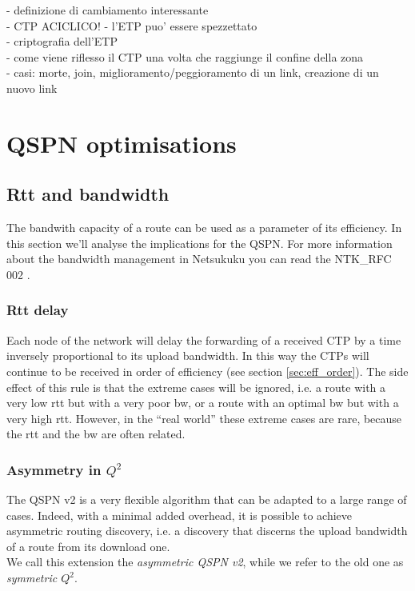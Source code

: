 \documentclass[a4paper]{article}
\begin{document}
- definizione di cambiamento interessante\\
- CTP ACICLICO!
- l'ETP puo' essere spezzettato\\
- criptografia dell'ETP\\
- come viene riflesso il CTP una volta che raggiunge il confine della zona\\
- casi: morte, join, miglioramento/peggioramento di un link, creazione di un nuovo link
%
%
%

\section{QSPN optimisations}
\subsection{Rtt and bandwidth}
\label{sec:bandwidth_q1q2}

The bandwith capacity of a route can be used as a parameter of its
efficiency. In this section we'll analyse the implications for the QSPN.
For more information about the bandwidth management in Netsukuku you can read
the NTK\_RFC 002 \cite{ntkrfc0002}.

\subsubsection{Rtt delay}
\label{sec:rtt_delay}

Each node of the network will delay the forwarding of a received CTP by a time
inversely proportional to its upload bandwidth. In this way the CTPs will
continue to be received in order of efficiency (see section
\ref{sec:eff_order}).
The side effect of this rule is that the extreme cases will be ignored, i.e. a
route with a very low rtt but with a very poor bw, or a route with an optimal
bw but with a very high rtt. However, in the ``real world'' these extreme
cases are rare, because the rtt and the bw are often related.

\subsubsection{Asymmetry in $Q^2$}
The QSPN v2 is a very flexible algorithm that can be adapted to a large range
of cases. Indeed, with a minimal added overhead, it is possible to achieve
asymmetric routing discovery, i.e. a discovery that discerns the upload
bandwidth of a route from its download one.\\
We call this extension the \emph{asymmetric QSPN v2}, while we refer to the
old one as \emph{symmetric $Q^2$}.
\end{document}
